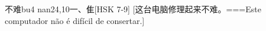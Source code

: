 \begin{EntryWithPhonetic}{不难}{bu4 nan2}{4,10}{⼀、⾫}[HSK 7-9]
  [这台电脑修理起来不难。===Este computador não é difícil de consertar.]
\end{EntryWithPhonetic}
